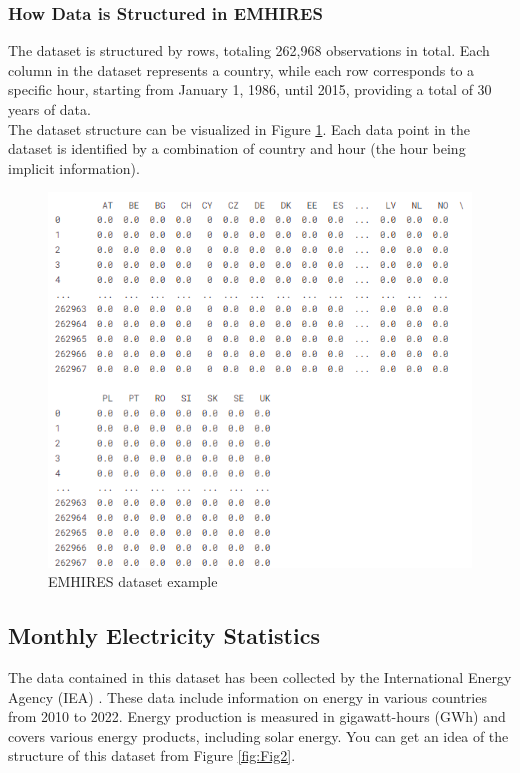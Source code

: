 \documentclass[12pt]{article}
\begin{document}
\subsubsection{How Data is Structured in EMHIRES}
The dataset is structured by rows, totaling 262,968 observations in total. Each column in the dataset represents a country, while each row corresponds to a specific hour, starting from January 1, 1986, until 2015, providing a total of 30 years of data.
\\
The dataset structure can be visualized in Figure \ref{fig:Fig1}. Each data point in the dataset is identified by a combination of country and hour (the hour being implicit information).

\begin{figure}[h]
    \centering
    \includegraphics[width=0.8\linewidth]{EMHIRES Structure.png}
    \caption{EMHIRES dataset example}
    \label{fig:Fig1}
  \end{figure}

\subsection{Monthly Electricity Statistics}
The data contained in this dataset has been collected by the International Energy Agency (IEA) \cite{iea_data}.
These data include information on energy in various countries from 2010 to 2022.
Energy production is measured in gigawatt-hours (GWh) and covers various energy products, including solar energy.
You can get an idea of the structure of this dataset from Figure \ref{fig:Fig2}.
\end{document}
